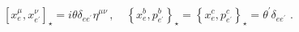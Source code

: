 \begin{equation}
\left[ x_{e}^{\mu },x_{e^{\prime }}^{\nu }\right] _{\star }=i\theta \delta
_{ee^{\prime }}\eta ^{\mu \nu }\,,\quad \left\{ x_{e}^{b},p_{e^{\prime
}}^{b}\right\} _{\star }=\left\{ x_{e}^{c},p_{e^{\prime }}^{c}\right\}
_{\star }={\theta ^{\prime }}\delta _{ee^{\prime }}\,\,.
\label{star_product}
\end{equation}%
